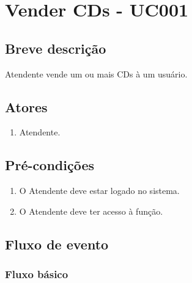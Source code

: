 \chapter{Vender CDs - UC001} \label{uc001}
 
\section{Breve descrição}

Atendente vende um ou mais CDs à um usuário.

\section{Atores}

\begin{enumerate}
	\item Atendente.
\end{enumerate}

\section{Pré-condições}

\begin{enumerate}
	\item O Atendente deve estar logado no sistema.
	\item O Atendente deve ter acesso à função.
\end{enumerate}

\section{Fluxo de evento}

\subsection{Fluxo básico}

